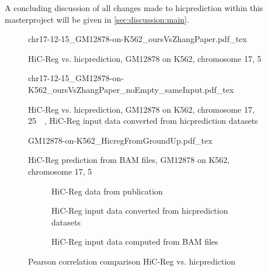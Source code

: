 A concluding discussion of all changes made to hicprediction within this masterproject
will be given in \autoref{sec:discussion:main}.
\begin{figure}[hbp]
\centering
\scriptsize
{chr17-12-15_GM12878-on-K562_oursVsZhangPaper.pdf_tex}
\caption{HiC-Reg vs. hicprediction, GM12878 on K562, chromosome 17, \SI{5}{\kilo\bp}}
\label{fig:res:HicregVsHicprediction_supplementary}
\end{figure}
\begin{figure}[hbp]
\centering
\scriptsize
{chr17-12-15_GM12878-on-K562_oursVsZhangPaper_noEmpty_sameInput.pdf_tex}
\caption{HiC-Reg vs. hicprediction, GM12878 on K562, chromosome 17, \SI{25}{\kilo\bp}, HiC-Reg input data converted from hicprediction datasets}
\label{fig:res:HicregVsHicprediction_recomputed}
\end{figure}
\begin{figure}[hbp]
\centering
\scriptsize
{GM12878-on-K562_HicregFromGroundUp.pdf_tex}
\caption{HiC-Reg prediction from BAM files, GM12878 on K562, chromosome 17, \SI{5}{\kilo\bp}}
\label{fig:res:HicregVsHicprediction_fromGroundUp}
\end{figure}
\begin{figure}[hbp]
\centering
\begin{subfigure}[t]{.495\textwidth}
  \centering
 \caption{HiC-Reg data from publication \cite{Zhang2019}}
 \label{fig:res:Pearson:K562:chr17:5kb:HicregFromPublication}
\end{subfigure}\hfill%
\begin{subfigure}[t]{.495\textwidth}
  \centering
 \caption{HiC-Reg input data converted from hicprediction datasets}
 \label{fig:res:Pearson:K562:chr17:5kb:HicregFromConversion}
\end{subfigure}
\begin{subfigure}{.495\textwidth}
  \vspace{5mm}
  \centering
 \caption{HiC-Reg input data computed from BAM files}
 \label{fig:res:Pearson:K562:chr17:5kb:HicregFromBam}
\end{subfigure}
\caption{Pearson correlation comparison HiC-Reg vs. hicprediction}
\label{fig:res:Pearson:hicRegVsHicprediction}
\end{figure}